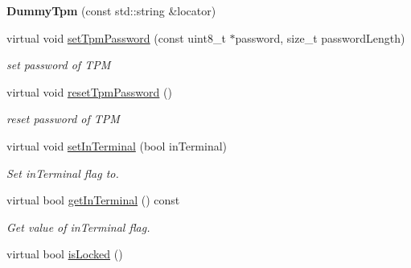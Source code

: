 \begin{DoxyCompactItemize}
\item 
{\bfseries Dummy\+Tpm} (const std\+::string \&locator)\hypertarget{classndn_1_1security_1_1DummyTpm_a2351c6c5b2fa1371228ce60aa853a982}{}\label{classndn_1_1security_1_1DummyTpm_a2351c6c5b2fa1371228ce60aa853a982}

\item 
virtual void \hyperlink{classndn_1_1security_1_1DummyTpm_a18710d82eb0d95634a0dfa92574ae563}{set\+Tpm\+Password} (const uint8\+\_\+t $\ast$password, size\+\_\+t password\+Length)
\begin{DoxyCompactList}\small\item\em set password of T\+PM \end{DoxyCompactList}\item 
virtual void \hyperlink{classndn_1_1security_1_1DummyTpm_ac2ea7471cb60096d1933028fe633f8e1}{reset\+Tpm\+Password} ()\hypertarget{classndn_1_1security_1_1DummyTpm_ac2ea7471cb60096d1933028fe633f8e1}{}\label{classndn_1_1security_1_1DummyTpm_ac2ea7471cb60096d1933028fe633f8e1}

\begin{DoxyCompactList}\small\item\em reset password of T\+PM \end{DoxyCompactList}\item 
virtual void \hyperlink{classndn_1_1security_1_1DummyTpm_a2c75ad58129b274a4ed2a15cf3988e67}{set\+In\+Terminal} (bool in\+Terminal)
\begin{DoxyCompactList}\small\item\em Set in\+Terminal flag to. \end{DoxyCompactList}\item 
virtual bool \hyperlink{classndn_1_1security_1_1DummyTpm_a5f1ebc7cba9562f960e38555398fb05f}{get\+In\+Terminal} () const\hypertarget{classndn_1_1security_1_1DummyTpm_a5f1ebc7cba9562f960e38555398fb05f}{}\label{classndn_1_1security_1_1DummyTpm_a5f1ebc7cba9562f960e38555398fb05f}

\begin{DoxyCompactList}\small\item\em Get value of in\+Terminal flag. \end{DoxyCompactList}\item 
virtual bool \hyperlink{classndn_1_1security_1_1DummyTpm_a5ebf7ebec4b72fcb1c3540275cf33145}{is\+Locked} ()\hypertarget{classndn_1_1security_1_1DummyTpm_a5ebf7ebec4b72fcb1c3540275cf33145}{}\label{classndn_1_1security_1_1DummyTpm_a5ebf7ebec4b72fcb1c3540275cf33145}


\end{DoxyCompactItemize}
